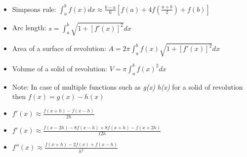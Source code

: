 \begin{itemize}
  \item Simpsons rule: $\int_{a}^{b}f(x)dx \approx \frac{b-a}{6}[f(a)+4f(\frac{a+b}{2})+f(b)]$

  \item Arc length: $s = \int_{a}^{b}\sqrt{1+[f'(x)]^{2}}dx$

  \item Area of a surface of revolution: $A = 2\pi \int_{a}^{b}f(x)\sqrt{1+[f'(x)]^{2}}dx $

  \item Volume of a solid of revolution: $V = \pi \int_{a}^{b}f(x)^{2}dx$

  \item Note: In case of multiple functions such as \textit{g(x)} \textit{h(x)} for a solid of revolution then $f(x)=g(x)-h(x)$

  \item $f'(x)\approx \frac{f(x+h)-f(x-h)}{2h}$

  \item $f'(x)\approx \frac{f(x-2h)-8f(x-h)+8f(x+h)-f(x+2h)}{12h}$

  \item $f''(x)\approx \frac{f(x+h)-2f(x)+f(x-h)}{h^{2}}$
\end{itemize}
